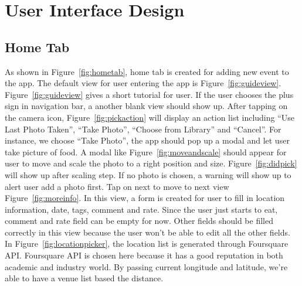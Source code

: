 \newpage
\section{User Interface Design} %
\label{sec:user_interface_design}

\subsection{Home Tab} %
\label{sub:tabs}
	As shown in Figure~\ref{fig:hometab}, home tab is created for adding new event to the app. The default view for user entering the app is Figure~\ref{fig:guideview}. \\
	
	Figure~\ref{fig:guideview} gives a short tutorial for user. If the user chooses the plus sign in navigation bar, a another blank view should show up. After tapping on the camera icon, Figure~\ref{fig:pickaction} will display an action list including ``Use Last Photo Taken'', ``Take Photo'', ``Choose from Library'' and ``Cancel''. For instance, we choose ``Take Photo'', the app should pop up a modal and let user take picture of food. A modal like Figure~\ref{fig:moveandscale} should appear for user to move and scale the photo to a right position and size. Figure~\ref{fig:didpick} will show up after scaling step. If no photo is chosen, a warning will show up to alert user add a photo first. Tap on next to move to next view Figure~\ref{fig:moreinfo}. In this view, a form is created for user to fill in location information, date, tags, comment and rate. Since the user just starts to eat, comment and 
rate field can be empty for now. Other fields should be filled correctly in this view because the user won't be able to edit all the other fields. In Figure~\ref{fig:locationpicker}, the location list is generated through Foursquare API. Foursquare API is chosen here because it has a good reputation in both academic and industry world. By passing current longitude and latitude, we're able to have a venue list based the distance.

